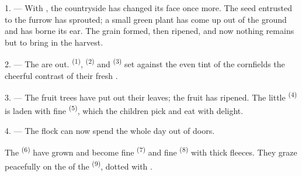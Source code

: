 %


\VUsaut{5.0mm}
\VUsaut{3.0mm}
\VUsaut{3.0mm}
\VUsaut{4.0mm}
\VUsaut{3.0mm}

1. --- With , the countryside has changed its face once
more. The seed entrusted to the furrow has sprouted; a small green plant
has come up out of the ground and has borne its ear. The grain formed,
then ripened, and now nothing remains but to bring in the harvest.

2. --- The  are out. 
\textsuperscript{(1)},  \textsuperscript{(2)} and 
\textsuperscript{(3)} set against the even tint of the cornfields the cheerful
contrast of their fresh .

3. --- The fruit trees have put out their leaves; the fruit has ripened.
The little  \textsuperscript{(4)} is laden with fine
 \textsuperscript{(5)}, which the children pick and eat with
delight.

4. --- The flock can now spend the whole day out of doors.

The  \textsuperscript{(6)} have grown and become fine 
\textsuperscript{(7)} and fine  \textsuperscript{(8)} with thick fleeces.
They graze peacefully on the  of the 
\textsuperscript{(9)}, dotted with .

